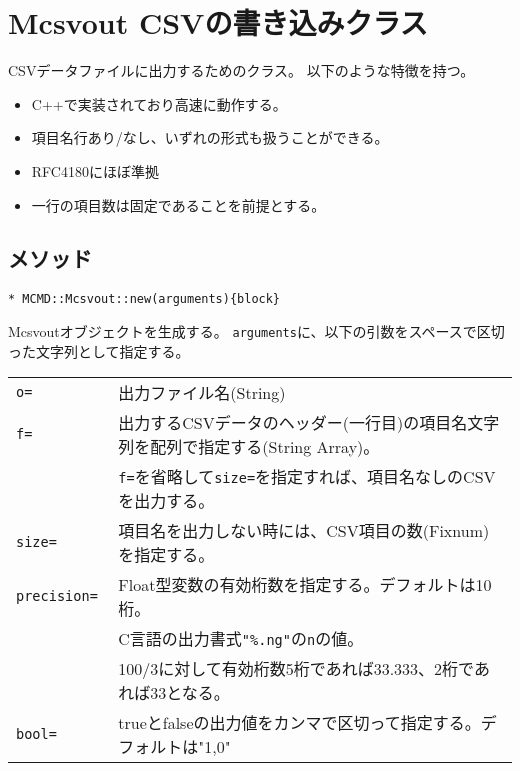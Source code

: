 
%

\section{Mcsvout CSVの書き込みクラス\label{sect:mcsvoutRB}}
CSVデータファイルに出力するためのクラス。
以下のような特徴を持つ。
\begin{itemize}
\setlength{\itemindent}{0mm}
\item C++で実装されており高速に動作する。
\item 項目名行あり/なし、いずれの形式も扱うことができる。
\item RFC4180にほぼ準拠
\item 一行の項目数は固定であることを前提とする。
\end{itemize}


\subsection{メソッド}

{\Large
\begin{verbatim}
* MCMD::Mcsvout::new(arguments){block}
\end{verbatim}
}

Mcsvoutオブジェクトを生成する。
\verb|arguments|に、以下の引数をスペースで区切った文字列として指定する。

\begin{table}[htbp]
\begin{tabular}{ll}
\verb|o=|    & 出力ファイル名(String)\\
\verb|f=|    & 出力するCSVデータのヘッダー(一行目)の項目名文字列を配列で指定する(String Array)。\\
             & \verb|f=|を省略して\verb/size=/を指定すれば、項目名なしのCSVを出力する。\\
\verb|size=| & 項目名を出力しない時には、CSV項目の数(Fixnum)を指定する。\\
\verb|precision= | & Float型変数の有効桁数を指定する。デフォルトは10桁。 \\
                   & C言語の出力書式\verb/"%.ng"/の\verb|n|の値。\\
                   & 100/3に対して有効桁数5桁であれば33.333、2桁であれば33となる。\\
\verb|bool=| & trueとfalseの出力値をカンマで区切って指定する。デフォルトは"1,0"\\
\end{tabular} 
\end{table} 

